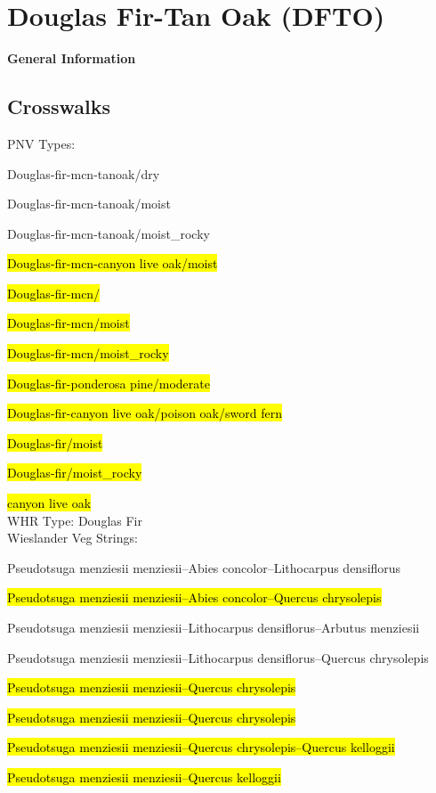 \documentclass{article}
\begin{document}
\renewcommand{\arraystretch}{1.1}


\section*{\LARGE{Douglas Fir-Tan Oak (DFTO)}}

\begin{snugshade}\Large \textbf{General Information} \end{snugshade}

\subsection*{Crosswalks}
PNV Types:
\par Douglas-fir-mcn-tanoak/dry
\par Douglas-fir-mcn-tanoak/moist
\par Douglas-fir-mcn-tanoak/moist\_rocky
\par \hl{Douglas-fir-mcn-canyon live oak/moist}
\par \hl{Douglas-fir-mcn/}
\par \hl{Douglas-fir-mcn/moist}
\par \hl{Douglas-fir-mcn/moist\_rocky}
\par \hl{Douglas-fir-ponderosa pine/moderate}
\par \hl{Douglas-fir-canyon live oak/poison oak/sword fern}
\par \hl{Douglas-fir/moist}
\par \hl{Douglas-fir/moist\_rocky}
\par \hl{canyon live oak}\\
WHR Type: Douglas Fir\\
Wieslander Veg Strings:
\par Pseudotsuga menziesii menziesii--Abies concolor--Lithocarpus densiflorus
\par \hl{Pseudotsuga menziesii menziesii--Abies concolor--Quercus chrysolepis}
\par Pseudotsuga menziesii menziesii--Lithocarpus densiflorus--Arbutus menziesii
\par Pseudotsuga menziesii menziesii--Lithocarpus densiflorus--Quercus chrysolepis
\par \hl{Pseudotsuga menziesii menziesii--Quercus chrysolepis}
\par \hl{Pseudotsuga menziesii menziesii--Quercus chrysolepis}
\par \hl{Pseudotsuga menziesii menziesii--Quercus chrysolepis--Quercus kelloggii}
\par \hl{Pseudotsuga menziesii menziesii--Quercus kelloggii}
\end{document}
